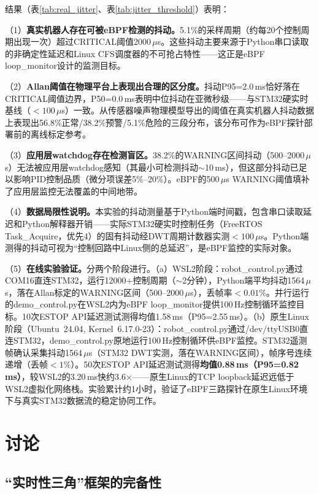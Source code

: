 \documentclass{rjthesis}
\begin{document}
结果（表\ref{tab:real_jitter}、表\ref{tab:jitter_threshold}）表明：

（1）\textbf{真实机器人存在可被eBPF检测的抖动。}5.1\%的采样周期（约每20个控制周期出现一次）超过CRITICAL阈值2000\,$\mu$s。这些抖动主要来源于Python串口读取的非确定性延迟和Linux CFS调度器的不可抢占特性——这正是eBPF loop\_monitor设计的监测目标。

（2）\textbf{Allan阈值在物理平台上表现出合理的区分度。}抖动P95=2.0\,ms恰好落在CRITICAL阈值边界，P50=0.0\,ms表明中位抖动在亚微秒级——与STM32硬实时基线（$<100\,\mu$s）一致。从传感器噪声物理模型导出的阈值在真实机器人抖动数据上表现出56.8\%正常/38.2\%预警/5.1\%危险的三段分布，该分布可作为eBPF探针部署前的离线标定参考。

（3）\textbf{应用层watchdog存在检测盲区。}38.2\%的WARNING区间抖动（500--2000\,$\mu$s）无法被应用层watchdog感知（其最小可检测抖动$\sim$10\,ms），但这部分抖动已足以影响PID控制品质（微分项误差5\%--20\%）。eBPF的500\,$\mu$s WARNING阈值填补了应用层监控无法覆盖的中间地带。

（4）\textbf{数据局限性说明。}本实验的抖动测量基于Python端时间戳，包含串口读取延迟和Python解释器开销——实际STM32硬实时控制任务（FreeRTOS Task\_Acquire，优先4）的固有抖动经DWT周期计数器实测$<100\,\mu$s。Python端测得的抖动可视为``控制回路中Linux侧的总延迟''，是eBPF监控的实际对象。

（5）\textbf{在线实验验证。}分两个阶段进行。（a）WSL2阶段：robot\_control.py通过COM16直连STM32，运行12000+控制周期（$\sim$2分钟），Python端平均抖动1564\,$\mu$s，落在Allan标定的WARNING区间（500--2000\,$\mu$s），丢帧率$<0.01\%$。并行运行的demo\_control.py在WSL2内为eBPF loop\_monitor提供100\,Hz控制循环监控目标。10次ESTOP API延迟测试测得均值1.58\,ms（P95=2.55\,ms）。（b）原生Linux阶段（Ubuntu~24.04, Kernel~6.17.0-23）：robot\_control.py通过/dev/ttyUSB0直连STM32，demo\_control.py原地运行100\,Hz控制循环供eBPF监控。STM32遥测帧确认采集抖动1564\,$\mu$s（STM32 DWT实测，落在WARNING区间），帧序号连续递增（丢帧$<1\%$）。50次ESTOP API延迟测试测得\textbf{均值0.88\,ms（P95=0.82\,ms）}，较WSL2的3.20\,ms快约3.6$\times$——原生Linux的TCP loopback延迟远低于WSL2虚拟化网络栈。实验累计约1小时，验证了eBPF三路探针在原生Linux环境下与真实STM32数据流的稳定协同工作。

\section{讨论}

\subsection{``实时性三角''框架的完备性}
\end{document}
